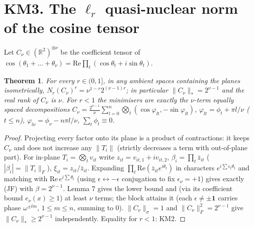 \documentclass[11pt]{article}
\newtheorem{theorem}{Theorem}\newtheorem{proposition}{Proposition}
\begin{document}
\section*{KM3. The $\ell_r$ quasi-nuclear norm of the cosine tensor}
Let $C_\nu\in(\mathbb R^2)^{\otimes\nu}$ be the coefficient tensor of $\cos(\theta_1+\dots+\theta_\nu)=\mathrm{Re}\prod_t(\cos\theta_t+i\sin\theta_t)$.
\begin{theorem}
For every $r\in(0,1]$, in any ambient spaces containing the planes isometrically, $N_r(C_\nu)^r=\nu^{1-r}2^{(\nu-1)r}$; in particular $\|C_\nu\|_*=2^{\nu-1}$ and the real rank of $C_\nu$ is $\nu$.
For $r<1$ the minimisers are exactly the $\nu$-term equally spaced decompositions $C_\nu=\frac{2^{\nu-1}}\nu\sum_{l=0}^{n}\bigotimes_t(\cos\varphi_{lt},-\sin\varphi_{lt})$, $\varphi_{lt}=\phi_t+\pi l/\nu$ ($t\le n$), $\varphi_{l\nu}=\phi_\nu-n\pi l/\nu$, $\sum_t\phi_t\equiv0$.
\end{theorem}
\begin{proof}
Projecting every factor onto its plane is a product of contractions: it keeps $C_\nu$ and does not increase any $\|T_i\|$ (strictly decreases a term with out-of-plane part).
For in-plane $T_i=\bigotimes_tv_{it}$ write $z_{it}=v_{it,1}+iv_{it,2}$, $\beta_i=\prod_t\bar z_{it}$ ($|\beta_i|=\|T_i\|_F$), $\xi_{it}=z_{it}/\bar z_{it}$.
Expanding $\prod_t\mathrm{Re}(\bar z_{it}e^{i\theta_t})$ in characters $e^{i\sum\epsilon_t\theta_t}$ and matching with $\mathrm{Re}\,e^{i\sum\theta_t}$ (using $\epsilon\leftrightarrow-\epsilon$ conjugation to fix $\epsilon_\nu=+1$)
gives exactly (JF) with $\beta=2^{\nu-1}$. Lemma 7 gives the lower bound and (via its coefficient bound $e_\nu(x)\ge1$) at least $\nu$ terms; the block attains it
(each $\epsilon\ne\pm\mathbf 1$ carries phase $\omega^{\pm lm}$, $1\le m\le n$, summing to $0$). $\|C_\nu\|_\sigma=1$ and $\|C_\nu\|_F^2=2^{\nu-1}$ give $\|C_\nu\|_*\ge2^{\nu-1}$ independently.
Equality for $r<1$: KM2.
\end{proof}
\end{document}
